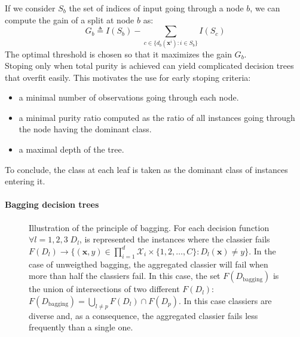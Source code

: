                 If we consider $S_b$ the set of indices of input going through a node $b$, we can compute the gain of a split at node $b$ as:
                \begin{equation}
                    \label{eq::split_gain}
                    G_b \triangleq I(S_b) - \sum_{c \in \{d_b(\bm{x}^i): i \in S_b\}} I(S_c)
                \end{equation}
                The optimal threshold is chosen so that it maximizes the gain $G_b$.\\
                Stoping only when total purity is achieved can yield complicated decision trees that overfit easily.
                This motivates the use for early stoping criteria:
                \begin{itemize}
                    \item a minimal number of observations going through each node.
                    \item a minimal purity ratio computed as the ratio of all instances going through the node having the dominant class.
                    \item a maximal depth of the tree.
                \end{itemize}
                To conclude, the class at each leaf is taken as the dominant class of instances entering it.

            \paragraph{Bagging decision trees}
                \begin{figure}
                    \centering
                    
                    \caption{
                        \label{fig::bagging} Illustration of the principle of bagging.
                        For each decision function $\forall l=1,2,3\;D_l$, is represented the instances where the classier fails $F(D_l) \rightarrow \{(\bm{x}, y) \in \prod_{i=1}^{d}\mathscr{X}_i \times \{1,2,\dots,C\} : D_l(\bm{x}) \neq y\}$.
                        In the case of unweigthed bagging, the aggregated classier will fail when more than half the classiers fail.
                        In this case, the set $F(D_{\text{bagging}})$ is the union of intersections of two different $F(D_l)$: $F(D_{\text{bagging}}) = \bigcup_{l\neq p} F(D_l) \cap F(D_p)$.
                        In this case classiers are diverse and, as a consequence, the aggregated classier fails less frequently than a single one.
                    }
                \end{figure}

